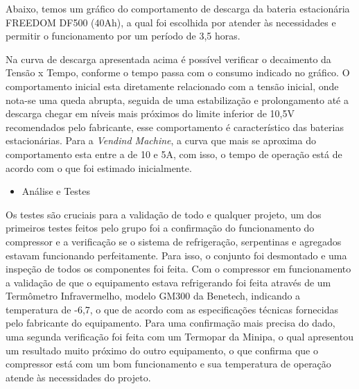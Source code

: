         Abaixo, temos um gráfico do comportamento de descarga da bateria estacionária FREEDOM DF500 (40Ah), a qual foi escolhida por atender às necessidades e permitir o funcionamento por um período de 3,5 horas.


		Na curva de descarga apresentada acima é possível verificar o decaimento da Tensão x Tempo, conforme o tempo passa com o consumo indicado no gráfico. O comportamento inicial esta diretamente relacionado com a tensão inicial, onde nota-se uma queda abrupta, seguida de uma estabilização e prolongamento até a descarga chegar em níveis mais próximos do limite inferior de 10,5V recomendados pelo fabricante, esse comportamento é característico das baterias estacionárias.
        Para a \textit{Vendind Machine}, a curva que mais se aproxima do comportamento esta entre a de 10 e 5A, com isso, o tempo de operação está de acordo com o que foi estimado inicialmente.
     
\begin{itemize}
\item Análise e Testes
\end{itemize}
			 Os testes são cruciais para a validação de todo e qualquer projeto, um dos primeiros testes feitos pelo grupo foi a confirmação do funcionamento do compressor e a verificação se o sistema de refrigeração, serpentinas e agregados estavam funcionando perfeitamente. Para isso, o conjunto foi desmontado e uma inspeção de todos os componentes foi feita. Com o compressor em funcionamento a validação de que o equipamento estava refrigerando foi feita através de um Termômetro Infravermelho, modelo GM300 da Benetech, indicando a temperatura de -6,7\degree, o que de acordo com as especificações técnicas fornecidas pelo fabricante do equipamento. Para uma confirmação mais precisa do dado, uma segunda verificação foi feita com um Termopar da Minipa, o qual apresentou um resultado muito próximo do outro equipamento, o que confirma que o compressor está com um bom funcionamento e sua temperatura de operação atende às necessidades do projeto.
             

